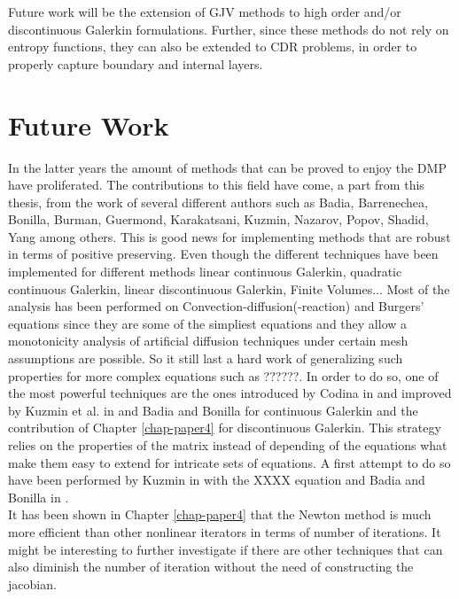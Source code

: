 Future work will be the extension of GJV methods to high order and/or discontinuous Galerkin formulations.
Further, since these methods do not rely on entropy functions, they can
also be extended to CDR problems, in order to properly capture boundary and internal layers. 

\section{Future Work}
In the latter years the amount of methods that can be proved to enjoy the DMP have proliferated. The contributions to this field have come, a part from this thesis, from the work of several different authors such as  Badia, Barrenechea, Bonilla, Burman, Guermond, Karakatsani, Kuzmin,  Nazarov, Popov, Shadid, Yang  \cite{barrenechea_blending_2015,guermond_second-order_2014,guermod_nazarov_2014,kuzmin_gradient-based_2016,jesus} among others. This is good news for implementing methods that are robust in terms of positive preserving. Even though the different techniques have been implemented for different methods linear continuous Galerkin, quadratic continuous Galerkin, linear discontinuous Galerkin, Finite Volumes... Most of the analysis has been performed on Convection-diffusion(-reaction) and Burgers' equations since they are some of the simpliest equations and they allow a monotonicity analysis of artificial diffusion techniques under certain mesh assumptions are possible. So it still last a hard work of generalizing such properties for more complex equations such as ??????. In order to do so, one of the most powerful techniques are the ones introduced by Codina in \cite{codina_discontinuity-capturing_1993} and improved by Kuzmin et al. in \cite{kuzmin_flux-corrected_2005} and Badia and Bonilla \cite{jesus} for continuous Galerkin and the contribution of Chapter \ref{chap-paper4} for discontinuous Galerkin. This strategy relies on the properties of the matrix instead of depending of the equations what make them easy to extend for intricate sets of equations. A first attempt to do so have been performed by Kuzmin in \cite{???} with the XXXX equation and Badia and Bonilla in \cite{jesus}.\\

It has been shown in Chapter \ref{chap-paper4} that the Newton method is much more efficient than other nonlinear iterators in terms of number of iterations. It might be interesting to further investigate if there are other techniques that can also diminish the number of iteration without the need of constructing the jacobian. 